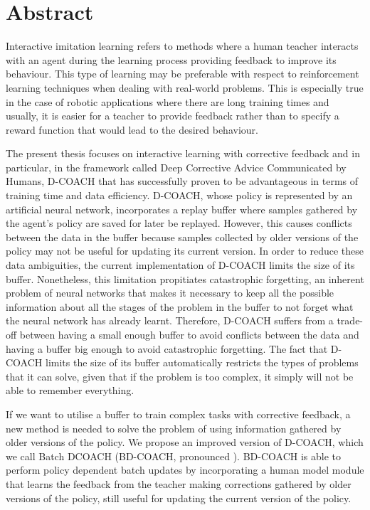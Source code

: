 \chapter*{Abstract}
Interactive imitation learning refers to methods where a human teacher interacts with an agent during the learning process providing feedback to improve its behaviour. This type of learning may be preferable with respect to reinforcement learning techniques when dealing with real-world problems. This is especially true in the case of robotic applications where there are long training times and usually, it is easier for a teacher to provide feedback rather than to specify a reward function that would lead to the desired behaviour.

\vspace{3mm} %

The present thesis focuses on interactive learning with corrective feedback and in particular, in the framework called Deep Corrective Advice Communicated by Humans, D-COACH that has successfully proven to be advantageous in terms of training time and data efficiency. D-COACH, whose policy is represented by an artificial neural network, incorporates a replay buffer where samples gathered by the agent's policy are saved for later be replayed. However, this causes conflicts between the data in the buffer because samples collected by older versions of the policy may not be useful for updating its current version. In order to reduce these data ambiguities, the current implementation of D-COACH limits the size of its buffer. Nonetheless, this limitation propitiates catastrophic forgetting, an inherent problem of neural networks that makes it necessary to keep all the possible information about all the stages of the problem in the buffer to not forget what the neural network has already learnt. Therefore, D-COACH suffers from a trade-off between having a small enough buffer to avoid conflicts between the data and having a buffer big enough to avoid catastrophic forgetting. The fact that D-COACH limits the size of its buffer automatically restricts the types of problems that it can solve, given that if the problem is too complex, it simply will not be able to remember everything.

\vspace{3mm} %

If we want to utilise a buffer to train complex tasks with corrective feedback, a new method is needed to solve the problem of using information gathered by older versions of the policy. We propose an improved version of D-COACH, which we call Batch DCOACH (BD-COACH, pronounced ). BD-COACH is able to perform policy dependent batch updates by incorporating a human model module that learns the feedback from the teacher making corrections gathered by older versions of the policy, still useful for updating the current version of the policy.

